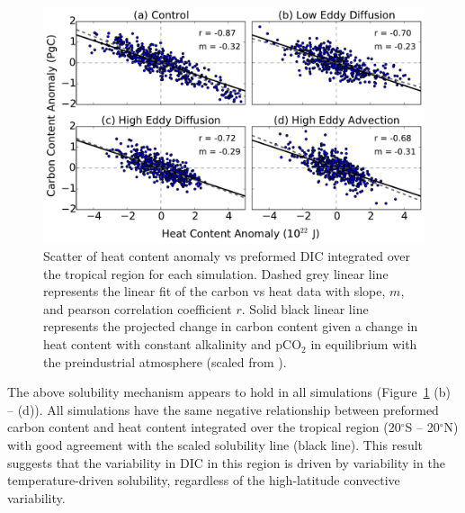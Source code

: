 \begin{figure}
\noindent
\centering
\includegraphics[width=33pc]{figure10.pdf}
\caption{Scatter of heat content anomaly vs preformed DIC integrated over the
tropical region for each simulation. Dashed grey linear line represents the linear fit of the carbon vs heat data with
slope, $m$, and pearson correlation coefficient $r$.
Solid black linear line represents the projected change
in carbon content given a change in heat content with constant alkalinity and
pCO$_2$ in equilibrium with the preindustrial atmosphere (scaled from \citet{Gruber1996}).
}
\label{fig:heat_dicpre_scatter}
\end{figure}

The above solubility mechanism appears to hold in all simulations
(Figure~\ref{fig:heat_dicpre_scatter} (b) -- (d)). All simulations have the same
negative relationship between preformed carbon content and heat content
integrated over the tropical region (20$^\circ{}$S -- 20$^\circ{}$N) with good
agreement with the scaled solubility line (black line). This result
suggests that the variability in DIC in this region is driven by variability
in the temperature-driven solubility, regardless of the high-latitude convective
variability.

